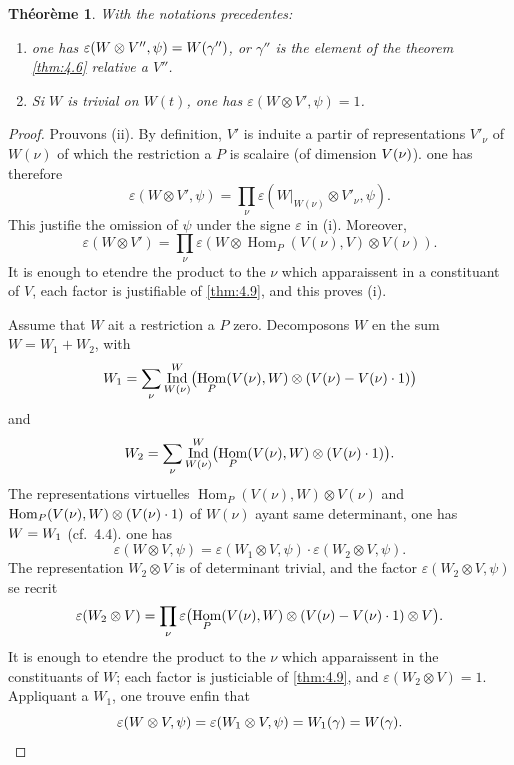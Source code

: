 \documentclass[12pt,a4paper]{article}
\theoremstyle{plain}
\newtheorem{theorem}{Th\'eor\`eme}[section]
\theoremstyle{definition}
\theoremstyle{remark}
\DeclareMathOperator{\Ind}{Ind}
\DeclareMathOperator{\Hom}{Hom}
\let\dim\relax\let\det\relax
\providecommand{\Hom}{\operatorname{Hom}}
\begin{document}
\begin{theorem}\label{thm:4.13}
With the notations precedentes:
\begin{enumerate}[label=(\roman*)]
\item one has $\varepsilon(W \otimes V'', \psi) = \det W(\gamma'')$, or $\gamma''$ is the element of the theorem \ref{thm:4.6} relative a $V''$.
\item Si $W$ is trivial on $W(t)$, one has $\varepsilon(W \otimes V', \psi) = 1$.
\end{enumerate}
\end{theorem}

\begin{proof}
Prouvons (ii). By definition, $V'$ is induite a partir of representations $V'_\nu$ of $W(\nu)$ of which the restriction a $P$ is scalaire (of dimension $\dim V(\nu)$). one has therefore
\[
\varepsilon(W \otimes V', \psi) = \prod_\nu \varepsilon(W|_{W(\nu)} \otimes V'_\nu, \psi).
\]
This justifie the omission of $\psi$ under the signe $\varepsilon$ in (i). Moreover,
\[
\varepsilon(W \otimes V') = \prod_\nu \varepsilon(W \otimes \Hom_P(V(\nu), V) \otimes V(\nu)).
\]
It is enough to etendre the product to the $\nu$ which apparaissent in a constituant of $V$, each factor is justifiable of \ref{thm:4.9}, and this proves (i).

Assume that $W$ ait a restriction a $P$ zero. Decomposons $W$ en the sum $W = W_1 + W_2$, with
\[
W_1 = \sum_\nu \Ind_{W(\nu)}^W\bigl(\Hom_P(V(\nu), W) \otimes (V(\nu) - \dim V(\nu) \cdot 1)\bigr)
\]
and
\[
W_2 = \sum_\nu \Ind_{W(\nu)}^W\bigl(\Hom_P(V(\nu), W) \otimes (\dim V(\nu) \cdot 1)\bigr).
\]
The representations virtuelles $\Hom_P(V(\nu), W) \otimes V(\nu)$ and $\Hom_P(V(\nu), W) \otimes (\dim V(\nu) \cdot 1)$ of $W(\nu)$ ayant same determinant, one has $\det W = \det W_1$ (cf.~4.4). one has
\[
\varepsilon(W \otimes V, \psi) = \varepsilon(W_1 \otimes V, \psi) \cdot \varepsilon(W_2 \otimes V, \psi).
\]
The representation $W_2 \otimes V$ is of determinant trivial, and the factor $\varepsilon(W_2 \otimes V, \psi)$ se recrit
\[
\varepsilon(W_2 \otimes V) = \prod_\nu \varepsilon\bigl(\Hom_P(V(\nu), W) \otimes (V(\nu) - \dim V(\nu) \cdot 1) \otimes V\bigr).
\]
It is enough to etendre the product to the $\nu$ which apparaissent in the constituants of $W$; each factor is justiciable of \ref{thm:4.9}, and $\varepsilon(W_2 \otimes V) = 1$. Appliquant a $W_1$, one trouve enfin that
\[
\varepsilon(W \otimes V, \psi) = \varepsilon(W_1 \otimes V, \psi) = \det W_1(\gamma) = \det W(\gamma). \qedhere
\]
\end{proof}
\end{document}
